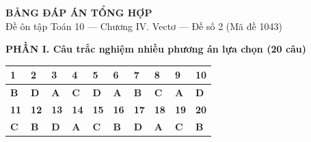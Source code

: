 \documentclass[10pt,a4paper]{article}
\begin{document}
\newpage
\pagestyle{dapan}
\setcounter{page}{1}

\begin{center}
  {\Large\bfseries\color{ink} BẢNG ĐÁP ÁN TỔNG HỢP}\\[2pt]
  {\small\color{gray!75!black} Đề ôn tập Toán 10 — Chương IV. Vectơ — Đề số 2 (Mã đề 1043)}
\end{center}
\vspace{1pt}

\noindent\textbf{PHẦN I. Câu trắc nghiệm nhiều phương án lựa chọn (20 câu)}
\vspace{1.5pt}

\begin{center}
\renewcommand{\arraystretch}{1.15}
\begin{tabular}{|C{0.95cm}|C{0.95cm}|C{0.95cm}|C{0.95cm}|C{0.95cm}|C{0.95cm}|C{0.95cm}|C{0.95cm}|C{0.95cm}|C{0.95cm}|}
\hline
\textbf{1} & \textbf{2} & \textbf{3} & \textbf{4} & \textbf{5} & \textbf{6} & \textbf{7} & \textbf{8} & \textbf{9} & \textbf{10} \\ \hline
\textbf{B} & \textbf{D} & \textbf{A} & \textbf{C} & \textbf{D} & \textbf{A} & \textbf{B} & \textbf{C} & \textbf{A} & \textbf{D} \\ \hline
\hline
\textbf{11} & \textbf{12} & \textbf{13} & \textbf{14} & \textbf{15} & \textbf{16} & \textbf{17} & \textbf{18} & \textbf{19} & \textbf{20} \\ \hline
\textbf{C} & \textbf{B} & \textbf{D} & \textbf{A} & \textbf{C} & \textbf{B} & \textbf{D} & \textbf{A} & \textbf{C} & \textbf{B} \\ \hline
\end{tabular}
\end{center}
\end{document}
